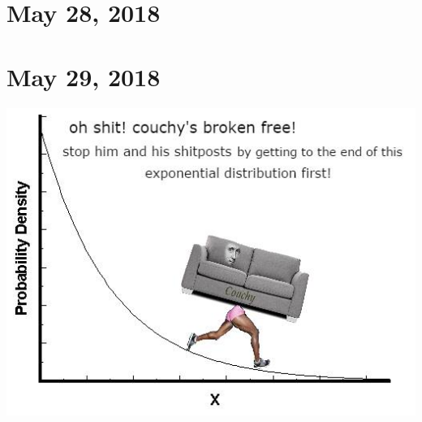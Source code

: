 \documentclass{article}
\begin{document}
\section{May 28, 2018}
\newpage


\section{May 29, 2018}
\newpage

\includegraphics[scale=0.6]{couchy.jpg}
\end{document}
